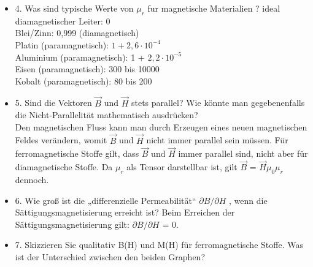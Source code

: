 \begin{itemize}
\item 4. Was sind typische Werte von $\mu_r$ fur magnetische Materialien ?
\newline 
ideal diamagnetischer Leiter: 0\\
Blei/Zinn: 0,999 (diamagnetisch)\\
Platin (paramagnetisch): $1 + 2,6\cdot 10^{-4}$\\
Aluminium (paramagnetisch): 1 + $2,2 \cdot10^{-5}$\\
Eisen (paramagnetisch): 300 bis 10000\\
Kobalt (paramagnetisch): 80 bis 200
\item 5. Sind die Vektoren
$\vec{B}$ und $\vec{H}$ stets parallel? Wie könnte man gegebenenfalls die Nicht-Parallelität
mathematisch ausdrücken?\\
Den magnetischen Fluss kann man durch Erzeugen eines neuen magnetischen Feldes verändern, womit $\vec{B}$ und $\vec{H}$ nicht immer parallel sein müssen. Für ferromagnetische Stoffe gilt, dass $\vec{B}$ und $\vec{H}$ immer parallel sind, nicht aber für diamagnetische Stoffe. Da $\mu_r$ als Tensor darstellbar ist, gilt $\vec{B}$ = $\vec{H}\mu_0\mu_r$ dennoch.
\item 6. Wie groß ist die „differenzielle Permeabilität“ $\partial
B/\partial H$ , wenn die Sättigungsmagnetisierung
erreicht ist?
\newline
Beim Erreichen der Sättigungsmagnetisierung gilt: $\partial B/\partial H$ = 0.
\item 7. Skizzieren Sie qualitativ B(H) und M(H) für ferromagnetische Stoffe. Was ist der Unterschied
zwischen den beiden Graphen?
\newline
\begin{figure}[!h]
	\centering
	\hfill


\end{figure}
\end{itemize}
